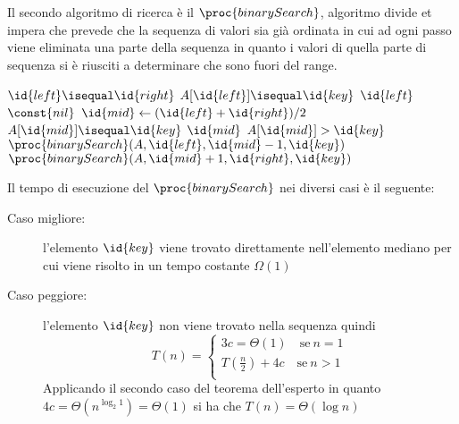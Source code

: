 Il secondo algoritmo di ricerca è il $\proc{binarySearch}$, algoritmo divide et impera che prevede che la sequenza
di valori sia già ordinata in cui ad ogni passo viene eliminata una parte della sequenza
in quanto i valori di quella parte di sequenza si è riusciti a determinare che sono fuori del range.

\begin{codebox}
\li \If $\id{left} \isequal \id{right}$
    \Then
\li                \If $A[\id{left}] \isequal \id{key}$
                   \Then
\li                            \Return $\id{left}$
\li                \Else \Return $\const{nil}$
    \End
\li \Else
\li                $\id{mid} \gets (\id{left} + \id{right}) / 2$
\li                \If $A[\id{mid}] \isequal \id{key}$
\li                   \Then \Return $\id{mid}$
                   \End
\li                \If $A[\id{mid}] > \id{key}$
                   \Then
\li                          \Return $\proc{binarySearch}(A,\id{left},\id{mid}-1,\id{key})$
\li                \Else \Return $\proc{binarySearch}(A,\id{mid}+1,\id{right},\id{key})$
    \End
\end{codebox}
Il tempo di esecuzione del $\proc{binarySearch}$ nei diversi casi è il seguente:
\begin{description}
  \item[Caso migliore:] l'elemento $\id{key}$ viene trovato direttamente nell'elemento mediano
        per cui viene risolto in un tempo costante $\Omega(1)$
  \item[Caso peggiore:] l'elemento $\id{key}$ non viene trovato nella sequenza quindi
        \begin{equation*}
           T(n) = \begin{cases} 3c = \Theta(1) \quad \text{se} \ n = 1 \\
                                T(\frac{n}{2}) + 4c \quad \text{se} \ n > 1\\
                  \end{cases}
        \end{equation*}
        Applicando il secondo caso del teorema dell'esperto in quanto $4c = \Theta(n^{\log _2 1}) = \Theta(1)$
        si ha che $T(n) = \Theta(\log n)$
\end{description}
